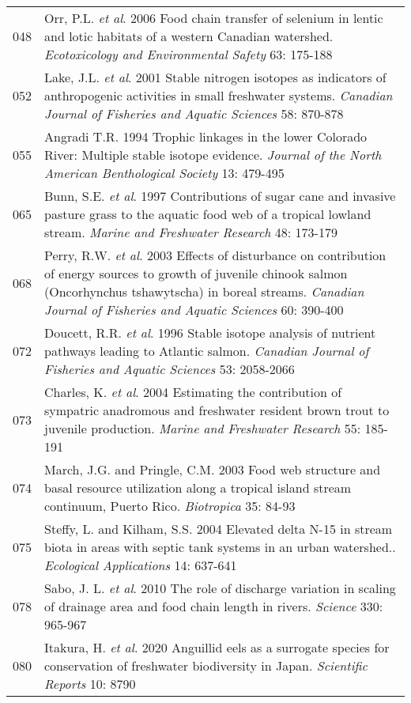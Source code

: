 \begin{longtable}{p{}p{}}
  048 & Orr, P.L. \textit{et al}. 2006 Food chain transfer of selenium in lentic and lotic habitats of a western Canadian watershed. \textit{Ecotoxicology and Environmental Safety} 63: 175-188 \\ 
  052 & Lake, J.L. \textit{et al}. 2001 Stable nitrogen isotopes as indicators of anthropogenic activities in small freshwater systems. \textit{Canadian Journal of Fisheries and Aquatic Sciences} 58: 870-878 \\ 
  055 & Angradi T.R. 1994 Trophic linkages in the lower Colorado River: Multiple stable isotope evidence. \textit{Journal of the North American Benthological Society} 13: 479-495 \\ 
  065 & Bunn, S.E. \textit{et al}. 1997 Contributions of sugar cane and invasive pasture grass to the aquatic food web of a tropical lowland stream. \textit{Marine and Freshwater Research} 48: 173-179 \\ 
  068 & Perry, R.W. \textit{et al}. 2003 Effects of disturbance on contribution of energy sources to growth of juvenile chinook salmon (Oncorhynchus tshawytscha) in boreal streams. \textit{Canadian Journal of Fisheries and Aquatic Sciences} 60: 390-400 \\ 
  072 & Doucett, R.R. \textit{et al}. 1996 Stable isotope analysis of nutrient pathways leading to Atlantic salmon. \textit{Canadian Journal of Fisheries and Aquatic Sciences} 53: 2058-2066 \\ 
  073 & Charles, K. \textit{et al}. 2004 Estimating the contribution of sympatric anadromous and freshwater resident brown trout to juvenile production. \textit{Marine and Freshwater Research} 55: 185-191 \\ 
  074 & March, J.G. and Pringle, C.M. 2003 Food web structure and basal resource utilization along a tropical island stream continuum, Puerto Rico. \textit{Biotropica} 35: 84-93 \\ 
  075 & Steffy, L. and Kilham, S.S. 2004 Elevated delta N-15 in stream biota in areas with septic tank systems in an urban watershed.. \textit{Ecological Applications} 14: 637-641 \\ 
  078 & Sabo, J. L. \textit{et al}. 2010 The role of discharge variation in scaling of drainage area and food chain length in rivers. \textit{Science} 330: 965-967 \\ 
  080 & Itakura, H. \textit{et al}. 2020 Anguillid eels as a surrogate species for conservation of freshwater biodiversity in Japan. \textit{Scientific Reports} 10: 8790 \\ 

\end{longtable}
